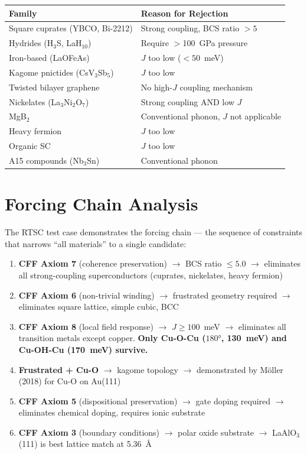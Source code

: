 \documentclass[11pt, a4paper]{article}
\begin{document}
\begin{center}
\begin{tabular}{@{}lp{7cm}@{}}
\toprule
\textbf{Family} & \textbf{Reason for Rejection} \\
\midrule
Square cuprates (YBCO, Bi-2212) & Strong coupling, BCS ratio $> 5$ \\
Hydrides (H$_3$S, LaH$_{10}$) & Require $>$100~GPa pressure \\
Iron-based (LaOFeAs) & $J$ too low ($< 50$~meV) \\
Kagome pnictides (CsV$_3$Sb$_5$) & $J$ too low \\
Twisted bilayer graphene & No high-$J$ coupling mechanism \\
Nickelates (La$_3$Ni$_2$O$_7$) & Strong coupling AND low $J$ \\
MgB$_2$ & Conventional phonon, $J$ not applicable \\
Heavy fermion & $J$ too low \\
Organic SC & $J$ too low \\
A15 compounds (Nb$_3$Sn) & Conventional phonon \\
\bottomrule
\end{tabular}
\end{center}

\section{Forcing Chain Analysis}

The RTSC test case demonstrates the forcing chain --- the sequence
of constraints that narrows ``all materials'' to a single
candidate:

\begin{enumerate}
  \item \textbf{CFF Axiom 7} (coherence preservation) $\to$
        BCS ratio $\leq 5.0$ $\to$ eliminates all strong-coupling
        superconductors (cuprates, nickelates, heavy fermion)

  \item \textbf{CFF Axiom 6} (non-trivial winding) $\to$
        frustrated geometry required $\to$ eliminates square
        lattice, simple cubic, BCC

  \item \textbf{CFF Axiom 8} (local field response) $\to$
        $J \geq 100$~meV $\to$ eliminates all transition metals
        except copper. \textbf{Only Cu-O-Cu ($180°$, 130~meV)
        and Cu-OH-Cu (170~meV) survive.}

  \item \textbf{Frustrated + Cu-O} $\to$ kagome topology $\to$
        demonstrated by M\"oller (2018) for Cu-O on Au(111)

  \item \textbf{CFF Axiom 5} (dispositional preservation) $\to$
        gate doping required $\to$ eliminates chemical doping,
        requires ionic substrate

  \item \textbf{CFF Axiom 3} (boundary conditions) $\to$
        polar oxide substrate $\to$ LaAlO$_3$(111) is best
        lattice match at 5.36~\AA
\end{enumerate}
\end{document}

